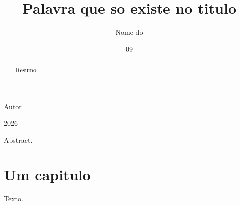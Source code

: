 \documentclass[dsc]{ufrj}
\begin{document}
\title{Palavra que so existe no titulo}
\author{Nome do}{Autor}
\date{09}{2026}
\maketitle
\frontmatter
\begin{abstract}Resumo.\end{abstract}
\begin{foreignabstract}Abstract.\end{foreignabstract}
\tableofcontents
\mainmatter
\chapter{Um capitulo}
Texto.
\end{document}
